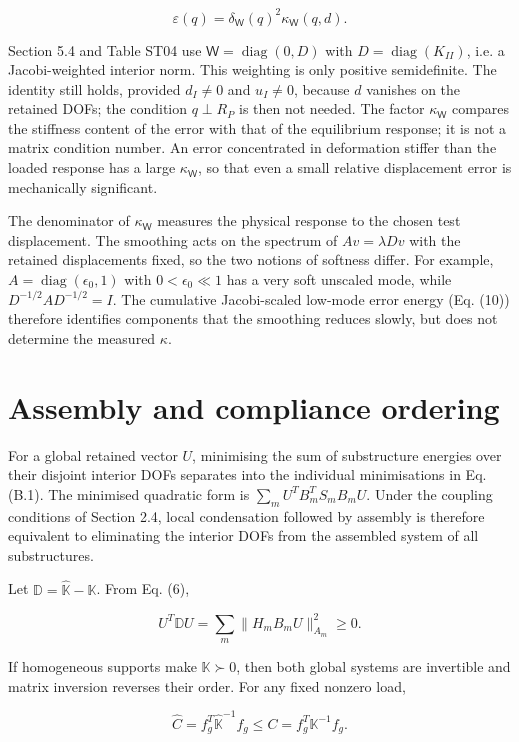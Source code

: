 \documentclass[preprint,12pt,authoryear]{elsarticle}
\begin{document}
\[
\boxed{\varepsilon(q)=\delta_{\mathsf W}(q)^2\kappa_{\mathsf W}(q,d).}
\tag{B.8}
\]

Section 5.4 and Table ST04 use \(\mathsf W=\operatorname{diag}(0,D)\) with \(D=\operatorname{diag}(K_{II})\), i.e. a Jacobi-weighted interior norm. This weighting is only positive semidefinite. The identity still holds, provided \(d_I\ne0\) and \(u_I\ne0\), because \(d\) vanishes on the retained DOFs; the condition \(q\perp R_P\) is then not needed. The factor \(\kappa_{\mathsf W}\) compares the stiffness content of the error with that of the equilibrium response; it is not a matrix condition number. An error concentrated in deformation stiffer than the loaded response has a large \(\kappa_{\mathsf W}\), so that even a small relative displacement error is mechanically significant.

The denominator of \(\kappa_{\mathsf W}\) measures the physical response to the chosen test displacement. The smoothing acts on the spectrum of \(Av=\lambda Dv\) with the retained displacements fixed, so the two notions of softness differ. For example, \(A=\operatorname{diag}(\epsilon_0,1)\) with \(0<\epsilon_0\ll1\) has a very soft unscaled mode, while \(D^{-1/2}AD^{-1/2}=I\). The cumulative Jacobi-scaled low-mode error energy (Eq. (10)) therefore identifies components that the smoothing reduces slowly, but does not determine the measured \(\kappa\).

\section{Assembly and compliance ordering}

For a global retained vector \(U\), minimising the sum of substructure energies over their disjoint interior DOFs separates into the individual minimisations in Eq. (B.1). The minimised quadratic form is \(\sum_m U^TB_m^TS_mB_mU\). Under the coupling conditions of Section 2.4, local condensation followed by assembly is therefore equivalent to eliminating the interior DOFs from the assembled system of all substructures.

Let \(\mathbb D=\widehat{\mathbb K}-\mathbb K\). From Eq. (6),

\[
U^T\mathbb D U=\sum_m\|H_m B_mU\|_{A_m}^2\ge0.
\tag{C.1}
\]

If homogeneous supports make \(\mathbb K\succ0\), then both global systems are invertible and matrix inversion reverses their order. For any fixed nonzero load,

\[
\widehat C=f_g^T\widehat{\mathbb K}^{-1}f_g
\le C=f_g^T\mathbb K^{-1}f_g.
\tag{C.2}
\]
\end{document}
